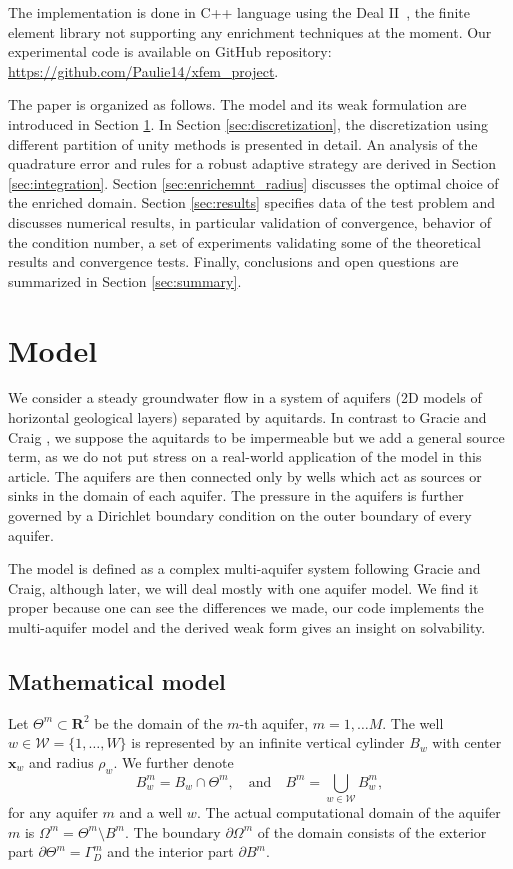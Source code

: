\documentclass{elsarticle}
\def\vc#1{\mathbf{\boldsymbol{#1}}}     %
\newcommand{\R}{\mathbf{R}}
\begin{document}
The implementation is done in C++ language using the Deal II~\cite{bangerth_deal.ii_2007}, the finite element library
not supporting any enrichment techniques at the moment. 
Our experimental code is available on GitHub repository: \url{https://github.com/Paulie14/xfem_project}.

The paper is organized as follows. The model and its weak formulation are introduced in Section \ref{sec:model}.
In Section \ref{sec:discretization}, the discretization using different partition of unity methods is presented in detail.
An analysis of the quadrature error and rules for a robust adaptive strategy are derived in Section \ref{sec:integration}.
Section \ref{sec:enrichemnt_radius} discusses the optimal choice of the enriched domain.
Section \ref{sec:results} specifies data of the test problem and discusses numerical results,
in particular validation of convergence, behavior of the condition number, a set of experiments validating some of the theoretical results and convergence tests.
Finally, conclusions and open questions are summarized in Section \ref{sec:summary}.

\section{Model}
\label{sec:model}
We consider a steady groundwater 
flow in a system of aquifers (2D models of horizontal geological layers) separated by aquitards. 
In contrast to Gracie and Craig \cite{gracie_modelling_2010}, we suppose the aquitards to be impermeable but we add a general source term, 
as we do not put stress on a real-world application of the model in this article. The aquifers are then connected only by wells 
which act as sources or sinks in the domain of each aquifer. The pressure in the aquifers is further governed 
by a Dirichlet boundary condition on the outer boundary of every aquifer.

The model is defined as a complex multi-aquifer system following Gracie and Craig,
although later, we will deal mostly with one aquifer model.
We find it proper because one can see the differences we made, our code implements the multi-aquifer model and
the derived weak form gives an insight on solvability.

\subsection{Mathematical model}
Let $\Theta^m\subset \R^2$ be the domain of the $m$-th aquifer, $m=1,\ldots M$.
The well $w\in\mathcal{W}=\{1,\ldots,W\}$ is represented by an infinite vertical cylinder $B_w$
with center $\vc{x}_w$ and radius $\rho_w$.  We further denote 
\[
 B^m_w = B_w \cap \Theta^m, \quad \text{and} \quad
 B^m=\bigcup\limits_{w\in \mathcal{W}}B^m_w,
\]
for any aquifer $m$ and a well $w$.
The actual computational domain of the aquifer $m$ is $\Omega^m = \Theta^m\setminus B^m$. The boundary $\partial\Omega^m$ of 
the domain consists of the exterior part $\partial\Theta^m=\Gamma^m_D$ and the interior part $\partial B^m$.
\end{document}
